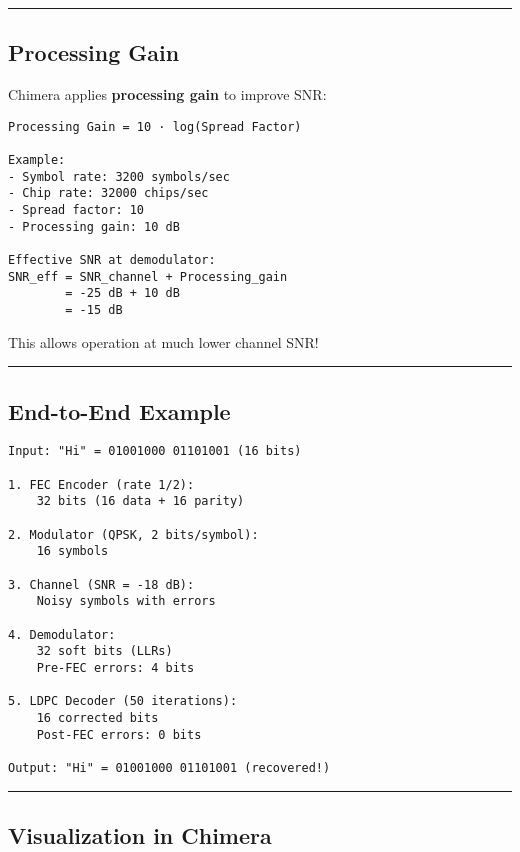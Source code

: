 \begin{center}\rule{0.5\linewidth}{0.5pt}\end{center}

\subsection{Processing Gain}\label{processing-gain}

Chimera applies \textbf{processing gain} to improve SNR:

\begin{verbatim}
Processing Gain = 10 · log(Spread Factor)

Example:
- Symbol rate: 3200 symbols/sec
- Chip rate: 32000 chips/sec
- Spread factor: 10
- Processing gain: 10 dB

Effective SNR at demodulator:
SNR_eff = SNR_channel + Processing_gain
        = -25 dB + 10 dB
        = -15 dB
\end{verbatim}

This allows operation at much lower channel SNR!

\begin{center}\rule{0.5\linewidth}{0.5pt}\end{center}

\subsection{End-to-End Example}\label{end-to-end-example}

\begin{verbatim}
Input: "Hi" = 01001000 01101001 (16 bits)

1. FEC Encoder (rate 1/2):
    32 bits (16 data + 16 parity)

2. Modulator (QPSK, 2 bits/symbol):
    16 symbols

3. Channel (SNR = -18 dB):
    Noisy symbols with errors

4. Demodulator:
    32 soft bits (LLRs)
    Pre-FEC errors: 4 bits

5. LDPC Decoder (50 iterations):
    16 corrected bits
    Post-FEC errors: 0 bits 

Output: "Hi" = 01001000 01101001 (recovered!)
\end{verbatim}

\begin{center}\rule{0.5\linewidth}{0.5pt}\end{center}

\subsection{Visualization in Chimera}\label{visualization-in-chimera}


